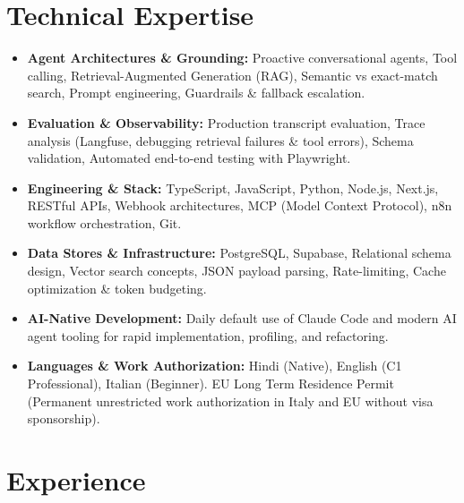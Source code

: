 \documentclass[10pt,a4paper]{article}
\begin{document}
\section{Technical Expertise}
\begin{itemize}
  \item \textbf{Agent Architectures \& Grounding:} Proactive conversational agents, Tool calling, Retrieval-Augmented Generation (RAG), Semantic vs exact-match search, Prompt engineering, Guardrails \& fallback escalation.
  \item \textbf{Evaluation \& Observability:} Production transcript evaluation, Trace analysis (Langfuse, debugging retrieval failures \& tool errors), Schema validation, Automated end-to-end testing with Playwright.
  \item \textbf{Engineering \& Stack:} TypeScript, JavaScript, Python, Node.js, Next.js, RESTful APIs, Webhook architectures, MCP (Model Context Protocol), n8n workflow orchestration, Git.
  \item \textbf{Data Stores \& Infrastructure:} PostgreSQL, Supabase, Relational schema design, Vector search concepts, JSON payload parsing, Rate-limiting, Cache optimization \& token budgeting.
  \item \textbf{AI-Native Development:} Daily default use of Claude Code and modern AI agent tooling for rapid implementation, profiling, and refactoring.
  \item \textbf{Languages \& Work Authorization:} Hindi (Native), English (C1 Professional), Italian (Beginner). EU Long Term Residence Permit (Permanent unrestricted work authorization in Italy and EU without visa sponsorship).
\end{itemize}

\section{Experience}
\end{document}

